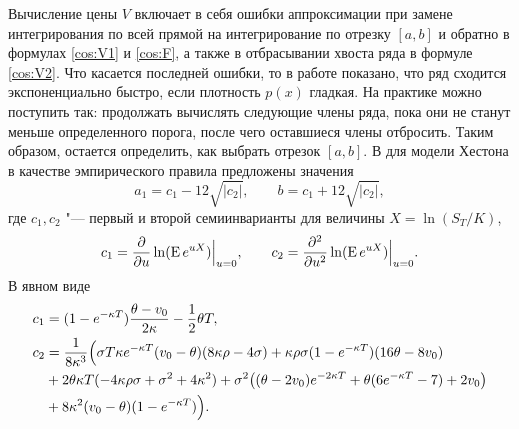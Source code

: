 Вычисление цены $V$ включает в себя ошибки аппроксимации при замене интегрирования по всей прямой на интегрирование по отрезку $[a,b]$ и обратно в формулах \eqref{cos:V1} и \eqref{cos:F}, а также в отбрасывании хвоста ряда в формуле \eqref{cos:V2}.
Что касается последней ошибки, то в работе \cite{FangOosterlee09} показано, что ряд сходится экспоненциально быстро, если плотность $p(x)$ гладкая.
На практике можно поступить так: продолжать вычислять следующие члены ряда, пока они не станут меньше определенного порога, после чего оставшиеся члены отбросить.
Таким образом, остается определить, как выбрать отрезок $[a,b]$.
В \cite{FangOosterlee09} для модели Хестона в качестве эмпирического правила предложены значения
\[
a_1 = c_1 - 12 \sqrt{|c_2|}, \qquad b = c_1 + 12\sqrt{|c_2|},
\]
где $c_1,c_2$ "--- первый и второй семиинварианты для величины $X=\ln (S_T/K)$, \te
\[
c_1 = \frac{\partial }{\partial u} \ln(\operatorname{E} e^{uX}) \Big|_{u=0}, \qquad
c_2 = \frac{\partial^2 }{\partial u^2} \ln(\operatorname{E} e^{uX}) \Big|_{u=0}.
\]
В явном виде
\begin{align*}
c_1 &= (1-e^{-\kappa T})\frac{\theta-v_0}{2\kappa} - \frac12\theta T,\\
c_2 &=\frac{1}{8\kappa^3}\Bigl(\sigma T \kappa e^{-\kappa T}(v_0-\theta)(8\kappa\rho-4\sigma) 
+\kappa\rho\sigma(1-e^{-\kappa T})(16\theta-8v_0)\\
&+2\theta\kappa T(-4\kappa\rho\sigma+\sigma^2+4\kappa^2)
+\sigma^2\bigl((\theta-2v_0)e^{-2\kappa T} + \theta(6e^{-\kappa T}-7)+2v_0\bigr)\\
&+8\kappa^2(v_0-\theta)(1-e^{-\kappa T})\Bigr).
\end{align*}
